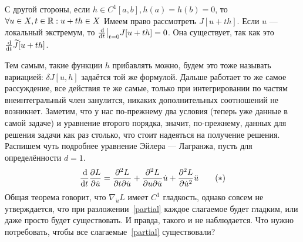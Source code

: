 \documentclass[a4paper]{article}
\begin{document}
    С другой стороны, если $h \in C^1[a, b], h(a) = h(b) = 0$, то $\forall u \in X, t \in \mathbb{R}: u + th \in X$
    Имеем право рассмотреть $J[u + th]$. Если $u$ --- локальный экстремум, то $\frac{\operatorname{d}\! }{\operatorname{d}\! t}\big|_{t = 0}J[u + th] = 0$.
    Она существует, так как это $\frac{\operatorname{d}\!}{\operatorname{d}\! t}\widetilde{J}[u + th]$.

    Тем самым, такие функции $h$ прибавлять можно, будем это тоже называть вариацией: $\delta J[u, h]$ задаётся той же формулой.
    Дальше работает то же самое рассуждение, все действия те же самые, только при интегрировании по частям внеинтегральный член занулится, никаких дополнительных соотношений не возникнет.
    Заметим, что у нас по-прежнему два условия (теперь уже данные в самой задаче) и уравнение второго порядка, значит, по-прежнему, данных для решения задачи как раз столько, что стоит надеяться на получение решения.
    Распишем чуть подробнее уравнение Эйлера --- Лагранжа, пусть для определённости $d = 1$.
    \[\frac{\operatorname{d}\!}{\operatorname{d}\! t}\frac{\partial L}{\partial \dot{u}} = \frac{\partial^2 L}{\partial t \partial \dot{u}} + \frac{\partial^2 L}{\partial u \partial \dot{u}}\dot{u} + \frac{\partial^2 L}{\partial \dot{u}^2}\ddot{u}\label{partial}\tag{$*$}\]
    Общая теорема говорит, что $\nabla_{\dot{u}}L$ имеет $C^1$ гладкость, однако совсем не утверждается, что при разложении~\eqref{partial} каждое слагаемое будет гладким, или даже просто будет существовать.
    И правда, такого и не наблюдается.
    Что нужно потребовать, чтобы все слагаемые~\eqref{partial} существовали?
\end{document}
